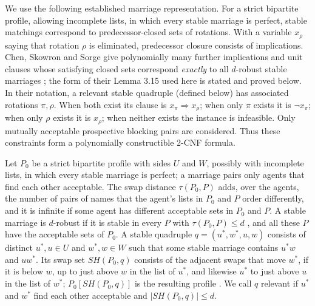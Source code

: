 \documentclass[11pt]{article}
\begin{document}
We use the following established marriage representation. For a strict
bipartite profile, allowing incomplete lists, in which every stable
marriage is perfect, stable matchings correspond
to predecessor-closed sets of rotations. With a variable $x_\rho$ saying
that rotation $\rho$ is eliminated, predecessor closure consists of
implications. Chen, Skowron and Sorge give polynomially many further
implications and unit clauses whose satisfying closed sets correspond
\emph{exactly} to all $d$-robust stable marriages
\cite[Proposition 3.9, Lemmas 3.15 and 3.19, and proof of Theorem 3.24]{css};
the form of their Lemma 3.15 used here is stated and proved below.
In their notation, a relevant stable quadruple (defined below) has associated rotations
$\pi,\rho$. When both exist its clause is $x_\pi\Rightarrow x_\rho$;
when only $\pi$ exists it is $\neg x_\pi$; when only $\rho$ exists it is
$x_\rho$; when neither exists the instance is infeasible. Only mutually
acceptable prospective blocking pairs are considered. Thus these
constraints form a polynomially constructible 2-CNF formula.

Let $P_0$ be a strict bipartite profile with sides $U$ and $W$, possibly
with incomplete lists, in which every stable marriage is perfect; a
marriage pairs only agents that find each other acceptable. The swap
distance $\tau(P_0,P)$ adds, over the agents, the number of pairs of names
that the agent's lists in $P_0$ and $P$ order differently, and it is
infinite if some agent has different acceptable sets in $P_0$ and $P$. A
stable marriage is $d$-robust if it is stable in every $P$ with
$\tau(P_0,P)\leq d$ \cite[\S2.1 and Definition 2.1, p.~7]{css}, and all
these $P$ have the acceptable sets of $P_0$. A stable quadruple
$q=(u^*,w^*,u,w)$ consists of distinct $u^*,u\in U$ and $w^*,w\in W$ such
that some stable marriage contains $u^*w$ and $uw^*$. Its swap set
$SH(P_0,q)$ consists of the adjacent swaps that move $w^*$, if it is below
$w$, up to just above $w$ in the list of $u^*$, and likewise $u^*$ to just
above $u$ in the list of $w^*$; $P_0[SH(P_0,q)]$ is the resulting profile
\cite[Definition 3.10]{css}. We call $q$ relevant if $u^*$ and $w^*$ find
each other acceptable and $|SH(P_0,q)|\leq d$.
\end{document}
